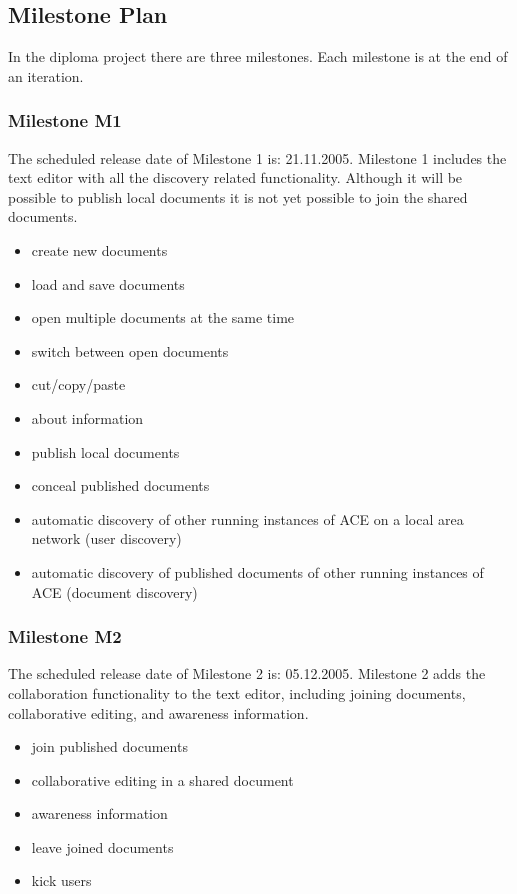\documentclass[11pt,a4paper]{article}
\begin{document}
\subsection{Milestone Plan}
\label{sect:Milestone Plan}

In the diploma project there are three milestones. Each milestone is at the end of an iteration.

\subsubsection{Milestone M1}

The scheduled release date of Milestone 1 is: 21.11.2005. Milestone 1 includes the text editor with
all the discovery related functionality. Although it will be possible to publish local documents
it is not yet possible to join the shared documents.

\begin{itemize}
 \item create new documents
 \item load and save documents
 \item open multiple documents at the same time
 \item switch between open documents
 \item cut/copy/paste
 \item about information
 \item publish local documents
 \item conceal published documents
 \item automatic discovery of other running instances of ACE on a local area network (user discovery)
 \item automatic discovery of published documents of other running instances of ACE (document discovery)
\end{itemize}

\subsubsection{Milestone M2}

The scheduled release date of Milestone 2 is: 05.12.2005. Milestone 2 adds the collaboration functionality
to the text editor, including joining documents, collaborative editing, and awareness information.

\begin{itemize}
 \item join published documents
 \item collaborative editing in a shared document
 \item awareness information
 \item leave joined documents
 \item kick users
\end{itemize}
\end{document}
